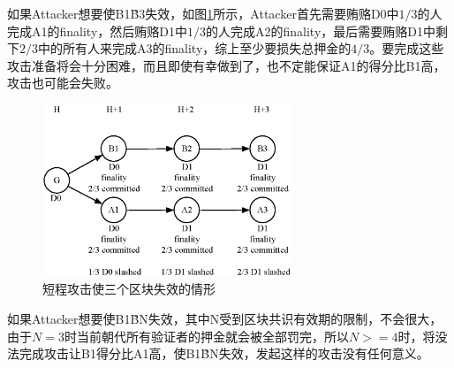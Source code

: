 如果Attacker想要使B1\~B3失效，如图\ref{fig:revert3}所示，Attacker首先需要贿赂D0中$1/3$的人完成A1的finality，然后贿赂D1中$1/3$的人完成A2的finality，最后需要贿赂D1中剩下$2/3$中的所有人来完成A3的finality，综上至少要损失总押金的$4/3$。要完成这些攻击准备将会十分困难，而且即使有幸做到了，也不定能保证A1的得分比B1高，攻击也可能会失败。

\begin{figure}[h]
\centering
\includegraphics[width=7.5cm]{./figs/revert3}
\caption{短程攻击使三个区块失效的情形}
\label{fig:revert3}
\end{figure}

如果Attacker想要使B1\~BN失效，其中N受到区块共识有效期的限制，不会很大，由于$N=3$时当前朝代所有验证者的押金就会被全部罚完，所以$N>=4$时，将没法完成攻击让B1得分比A1高，使B1\~BN失效，发起这样的攻击没有任何意义。
